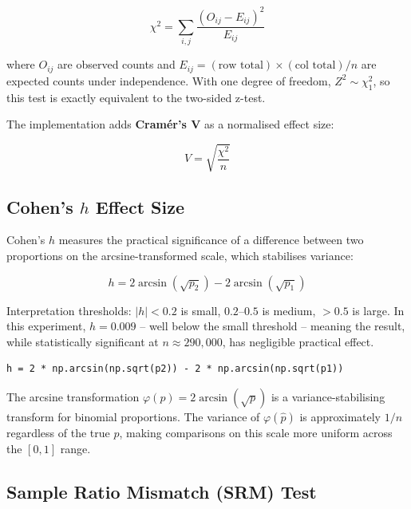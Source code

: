\begin{equation}
  \chi^2 = \sum_{i,j} \frac{(O_{ij} - E_{ij})^2}{E_{ij}}
\end{equation}

where $O_{ij}$ are observed counts and $E_{ij} = (\text{row total})
\times (\text{col total}) / n$ are expected counts under independence. With one
degree of freedom, $Z^2 \sim \chi^2_1$, so this test is exactly equivalent to
the two-sided z-test.

The implementation adds \textbf{Cram\'{e}r's V} as a normalised effect size:

\begin{equation}
  V = \sqrt{\frac{\chi^2}{n}}
\end{equation}

\subsection{Cohen's \texorpdfstring{$h$}{h} Effect Size}

Cohen's $h$ measures the practical significance of a difference between two
proportions on the arcsine-transformed scale, which stabilises variance:

\begin{equation}
  h = 2\arcsin\!\left(\sqrt{p_2}\right) - 2\arcsin\!\left(\sqrt{p_1}\right)
  \label{eq:cohens-h}
\end{equation}

Interpretation thresholds: $|h| < 0.2$ is small, $0.2$--$0.5$ is medium,
$> 0.5$ is large. In this experiment, $h = 0.009$ -- well below the small
threshold -- meaning the result, while statistically significant at
$n \approx 290{,}000$, has negligible practical effect.

\begin{lstlisting}[style=python, caption={Cohen's h (stats\_engine.py lines 113--114)}]
h = 2 * np.arcsin(np.sqrt(p2)) - 2 * np.arcsin(np.sqrt(p1))
\end{lstlisting}

\begin{keyinsight}
  The arcsine transformation $\varphi(p) = 2\arcsin(\sqrt{p})$ is a
  variance-stabilising transform for binomial proportions. The variance of
  $\varphi(\hat{p})$ is approximately $1/n$ regardless of the true $p$, making
  comparisons on this scale more uniform across the $[0,1]$ range.
\end{keyinsight}

\subsection{Sample Ratio Mismatch (SRM) Test}

